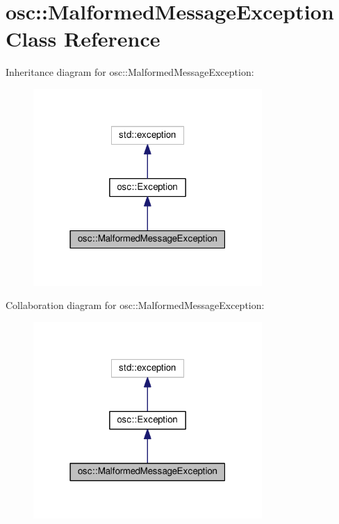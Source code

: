 \hypertarget{classosc_1_1_malformed_message_exception}{}\section{osc\+:\+:Malformed\+Message\+Exception Class Reference}
\label{classosc_1_1_malformed_message_exception}


Inheritance diagram for osc\+:\+:Malformed\+Message\+Exception\+:\nopagebreak
\begin{figure}[H]
\begin{center}
\leavevmode
\includegraphics[width=247pt]{classosc_1_1_malformed_message_exception__inherit__graph}
\end{center}
\end{figure}


Collaboration diagram for osc\+:\+:Malformed\+Message\+Exception\+:\nopagebreak
\begin{figure}[H]
\begin{center}
\leavevmode
\includegraphics[width=247pt]{classosc_1_1_malformed_message_exception__coll__graph}
\end{center}
\end{figure}
